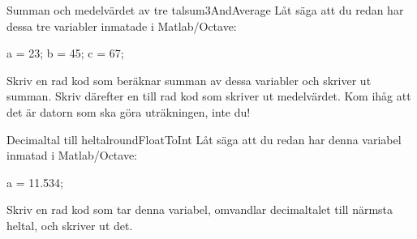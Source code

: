 \begin{matteovning}{Summan och medelvärdet av tre tal}{sum3AndAverage}
Låt säga att du redan har dessa tre variabler inmatade i Matlab/Octave:
\vspace{10pt}
\begin{matlab}
a = 23;
b = 45;
c = 67;
\end{matlab}

Skriv en rad kod som beräknar summan av dessa variabler och skriver ut summan. Skriv därefter en till rad kod som skriver ut medelvärdet. Kom ihåg att det är datorn som ska göra uträkningen, inte du!
\end{matteovning}
\begin{matteovning}{Decimaltal till heltal}{roundFloatToInt}
Låt säga att du redan har denna variabel inmatad i Matlab/Octave:
\vspace{10pt}
\begin{matlab}
a = 11.534;
\end{matlab}

Skriv en rad kod som tar denna variabel, omvandlar decimaltalet till närmsta heltal, och skriver ut det.
\end{matteovning}


